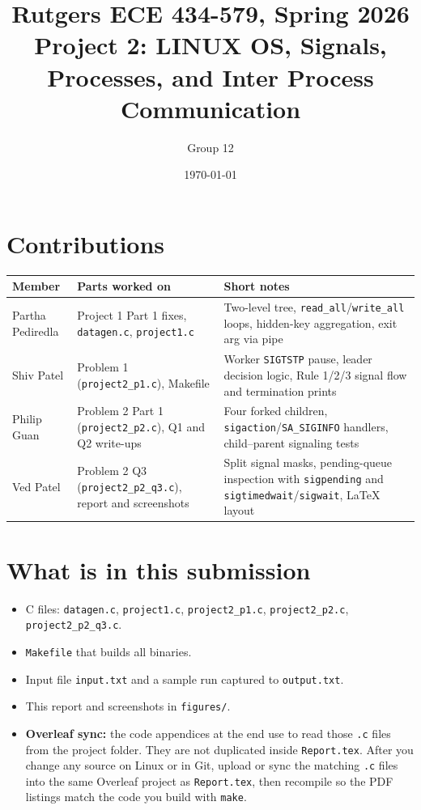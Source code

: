 \documentclass[11pt]{article}
\title{Rutgers ECE 434-579, Spring 2026\\
Project 2: LINUX OS, Signals, Processes, and Inter Process Communication}
\author{Group 12}
\date{\today}
\begin{document}
\maketitle

\section*{Contributions}
\begin{center}
\begin{tabular}{@{}l p{4.5cm} p{6.5cm}@{}}
\toprule
Member & Parts worked on & Short notes \\
\midrule
Partha Pediredla & Project 1 Part 1 fixes, \texttt{datagen.c}, \texttt{project1.c} &
  Two-level tree, \texttt{read\_all}/\texttt{write\_all} loops, hidden-key
  aggregation, exit arg via pipe \\
Shiv Patel & Problem 1 (\texttt{project2\_p1.c}), Makefile &
  Worker \texttt{SIGTSTP} pause, leader decision logic, Rule 1/2/3 signal flow
  and termination prints \\
Philip Guan & Problem 2 Part 1 (\texttt{project2\_p2.c}), Q1 and Q2 write-ups &
  Four forked children, \texttt{sigaction}/\texttt{SA\_SIGINFO} handlers,
  child--parent signaling tests \\
Ved Patel & Problem 2 Q3 (\texttt{project2\_p2\_q3.c}), report and screenshots &
  Split signal masks, pending-queue inspection with \texttt{sigpending} and
  \texttt{sigtimedwait}/\texttt{sigwait}, LaTeX layout \\
\bottomrule
\end{tabular}
\end{center}

\section*{What is in this submission}
\begin{itemize}
  \item C files: \texttt{datagen.c}, \texttt{project1.c}, \texttt{project2\_p1.c}, \texttt{project2\_p2.c}, \texttt{project2\_p2\_q3.c}.
  \item \texttt{Makefile} that builds all binaries.
  \item Input file \texttt{input.txt} and a sample run captured to \texttt{output.txt}.
  \item This report and screenshots in \texttt{figures/}.
  \item \textbf{Overleaf sync:} the code appendices at the end use
        \verb|| to read those \texttt{.c} files from the project
        folder. They are not duplicated inside \texttt{Report.tex}. After you change
        any source on Linux or in Git, upload or sync the matching \texttt{.c} files
        into the same Overleaf project as \texttt{Report.tex}, then recompile so the
        PDF listings match the code you build with \texttt{make}.
\end{itemize}
\end{document}
